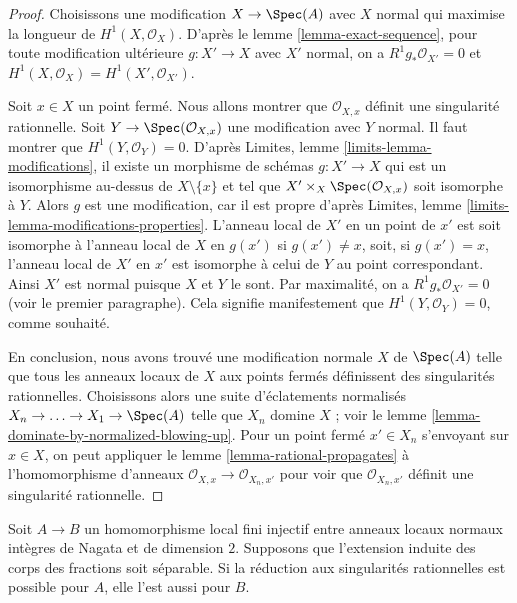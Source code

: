 \begin{proof} Choisissons une modification $X \to \Spec(A)$ avec $X$ normal qui maximise la longueur de $H^1(X, \mathcal{O}_X)$. D'après le lemme \ref{lemma-exact-sequence}, pour toute modification ultérieure $g : X' \to X$ avec $X'$ normal, on a $R^1g_*\mathcal{O}_{X'} = 0$ et $H^1(X, \mathcal{O}_X) = H^1(X', \mathcal{O}_{X'})$.

\medskip\noindent Soit $x \in X$ un point fermé. Nous allons montrer que $\mathcal{O}_{X, x}$ définit une singularité rationnelle. Soit $Y \to \Spec(\mathcal{O}_{X, x})$ une modification avec $Y$ normal. Il faut montrer que $H^1(Y, \mathcal{O}_Y) = 0$. D'après Limites, lemme \ref{limits-lemma-modifications}, il existe un morphisme de schémas $g : X' \to X$ qui est un isomorphisme au-dessus de $X \setminus \{x\}$ et tel que $X' \times_X \Spec(\mathcal{O}_{X, x})$ soit isomorphe à $Y$. Alors $g$ est une modification, car il est propre d'après Limites, lemme \ref{limits-lemma-modifications-properties}. L'anneau local de $X'$ en un point de $x'$ est soit isomorphe à l'anneau local de $X$ en $g(x')$ si $g(x') \not = x$, soit, si $g(x') = x$, l'anneau local de $X'$ en $x'$ est isomorphe à celui de $Y$ au point correspondant. Ainsi $X'$ est normal puisque $X$ et $Y$ le sont. Par maximalité, on a $R^1g_*\mathcal{O}_{X'} = 0$ (voir le premier paragraphe). Cela signifie manifestement que $H^1(Y, \mathcal{O}_Y) = 0$, comme souhaité.

\medskip\noindent En conclusion, nous avons trouvé une modification normale $X$ de $\Spec(A)$ telle que tous les anneaux locaux de $X$ aux points fermés définissent des singularités rationnelles. Choisissons alors une suite d'éclatements normalisés $X_n \to \ldots \to X_1 \to \Spec(A)$ telle que $X_n$ domine $X$ ; voir le lemme \ref{lemma-dominate-by-normalized-blowing-up}. Pour un point fermé $x' \in X_n$ s'envoyant sur $x \in X$, on peut appliquer le lemme \ref{lemma-rational-propagates} à l'homomorphisme d'anneaux $\mathcal{O}_{X, x} \to \mathcal{O}_{X_n, x'}$ pour voir que $\mathcal{O}_{X_n, x'}$ définit une singularité rationnelle. \end{proof}

\begin{lemma} \label{lemma-go-up-separable} Soit $A \to B$ un homomorphisme local fini injectif entre anneaux locaux normaux intègres de Nagata et de dimension $2$. Supposons que l'extension induite des corps des fractions soit séparable. Si la réduction aux singularités rationnelles est possible pour $A$, elle l'est aussi pour $B$. \end{lemma}

